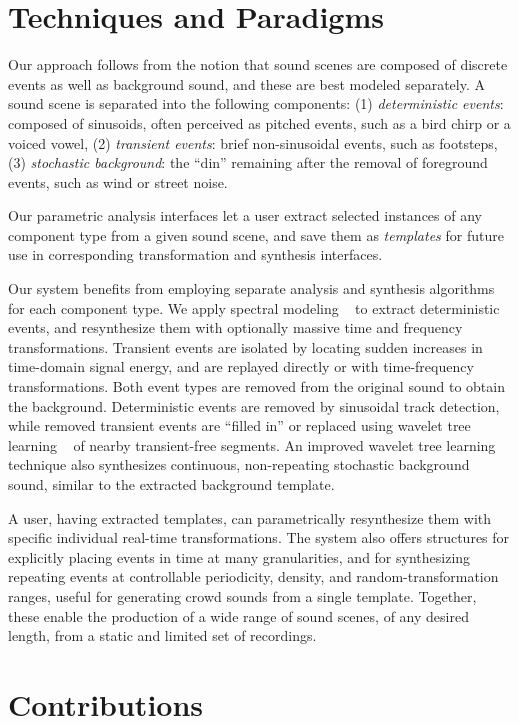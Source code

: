\documentclass{acmsiggraph}               %
\begin{document}
\section{Techniques and Paradigms}

Our approach follows from the notion that sound scenes are composed of
discrete events as well as background sound, and these are best modeled 
separately.  A sound scene is separated into the following components:
(1) {\it deterministic events}: composed of sinusoids, often
perceived as pitched events, such as a bird chirp or a voiced vowel,
(2) {\it transient events}: brief non-sinusoidal events, such as
footsteps, 
(3) {\it stochastic background}: the ``din'' remaining after the
removal of foreground events, such as wind or street noise.

Our parametric analysis interfaces let a user extract selected instances 
of any component type from a given sound scene, and save them as {\it
templates} for future use in corresponding transformation and synthesis
interfaces.

Our system benefits from employing separate analysis and synthesis
algorithms for each component type. We apply spectral modeling
~\cite{Serra89} to extract deterministic events, and resynthesize 
them with optionally massive time and frequency transformations.
Transient events are isolated by locating sudden increases in time-domain
signal energy, and are replayed directly or with time-frequency
transformations.  Both event types are removed from the original sound to
obtain the background. Deterministic events are removed by
sinusoidal track detection, while removed transient events are ``filled in'' or replaced 
using wavelet tree learning ~\cite{Dubnov02} of nearby 
transient-free segments.  An improved wavelet tree learning 
technique also synthesizes continuous, non-repeating stochastic 
background sound, similar to the extracted background template.

A user, having extracted templates, can parametrically resynthesize them
with specific individual real-time transformations. The system also offers
structures for explicitly placing events in time at many granularities,
and for synthesizing repeating events at controllable periodicity,
density, and random-transformation ranges, useful for generating crowd
sounds from a single template. Together, these enable the production of a
wide range of sound scenes, of any desired length, from a static and 
limited set of recordings.

\section{Contributions}
\end{document}
